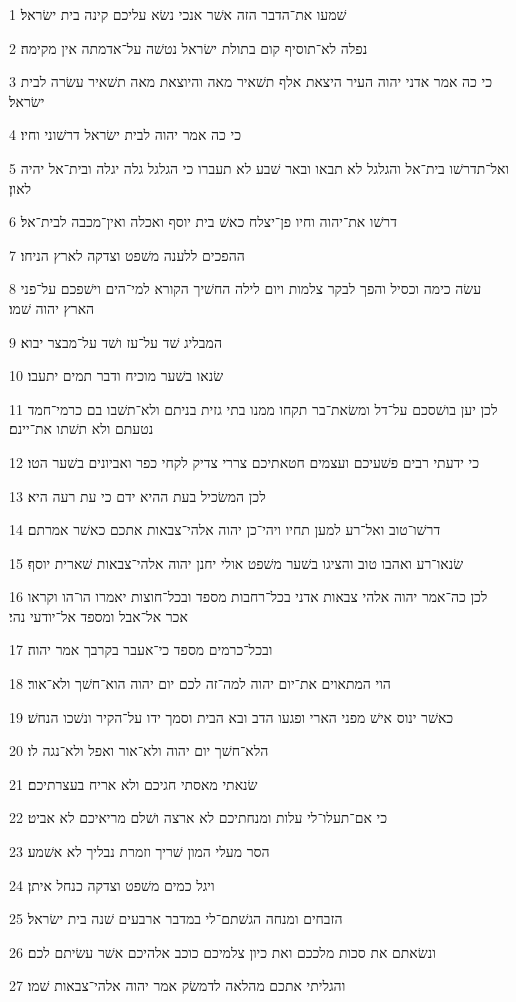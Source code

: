 \par 1 שׁמעו את־הדבר הזה אשׁר אנכי נשׂא עליכם קינה בית ישׂראל׃
\par 2 נפלה לא־תוסיף קום בתולת ישׂראל נטשׁה על־אדמתה אין מקימה׃
\par 3 כי כה אמר אדני יהוה העיר היצאת אלף תשׁאיר מאה והיוצאת מאה תשׁאיר עשׂרה לבית ישׂראל׃
\par 4 כי כה אמר יהוה לבית ישׂראל דרשׁוני וחיו׃
\par 5 ואל־תדרשׁו בית־אל והגלגל לא תבאו ובאר שׁבע לא תעברו כי הגלגל גלה יגלה ובית־אל יהיה לאון׃
\par 6 דרשׁו את־יהוה וחיו פן־יצלח כאשׁ בית יוסף ואכלה ואין־מכבה לבית־אל׃
\par 7 ההפכים ללענה משׁפט וצדקה לארץ הניחו׃
\par 8 עשׂה כימה וכסיל והפך לבקר צלמות ויום לילה החשׁיך הקורא למי־הים וישׁפכם על־פני הארץ יהוה שׁמו׃
\par 9 המבליג שׁד על־עז ושׁד על־מבצר יבוא׃
\par 10 שׂנאו בשׁער מוכיח ודבר תמים יתעבו׃
\par 11 לכן יען בושׁסכם על־דל ומשׂאת־בר תקחו ממנו בתי גזית בניתם ולא־תשׁבו בם כרמי־חמד נטעתם ולא תשׁתו את־יינם׃
\par 12 כי ידעתי רבים פשׁעיכם ועצמים חטאתיכם צררי צדיק לקחי כפר ואביונים בשׁער הטו׃
\par 13 לכן המשׂכיל בעת ההיא ידם כי עת רעה היא׃
\par 14 דרשׁו־טוב ואל־רע למען תחיו ויהי־כן יהוה אלהי־צבאות אתכם כאשׁר אמרתם׃
\par 15 שׂנאו־רע ואהבו טוב והציגו בשׁער משׁפט אולי יחנן יהוה אלהי־צבאות שׁארית יוסף׃
\par 16 לכן כה־אמר יהוה אלהי צבאות אדני בכל־רחבות מספד ובכל־חוצות יאמרו הו־הו וקראו אכר אל־אבל ומספד אל־יודעי נהי׃
\par 17 ובכל־כרמים מספד כי־אעבר בקרבך אמר יהוה׃
\par 18 הוי המתאוים את־יום יהוה למה־זה לכם יום יהוה הוא־חשׁך ולא־אור׃
\par 19 כאשׁר ינוס אישׁ מפני הארי ופגעו הדב ובא הבית וסמך ידו על־הקיר ונשׁכו הנחשׁ׃
\par 20 הלא־חשׁך יום יהוה ולא־אור ואפל ולא־נגה לו׃
\par 21 שׂנאתי מאסתי חגיכם ולא אריח בעצרתיכם׃
\par 22 כי אם־תעלו־לי עלות ומנחתיכם לא ארצה ושׁלם מריאיכם לא אביט׃
\par 23 הסר מעלי המון שׁריך וזמרת נבליך לא אשׁמע׃
\par 24 ויגל כמים משׁפט וצדקה כנחל איתן׃
\par 25 הזבחים ומנחה הגשׁתם־לי במדבר ארבעים שׁנה בית ישׂראל׃
\par 26 ונשׂאתם את סכות מלככם ואת כיון צלמיכם כוכב אלהיכם אשׁר עשׂיתם לכם׃
\par 27 והגליתי אתכם מהלאה לדמשׂק אמר יהוה אלהי־צבאות שׁמו׃

